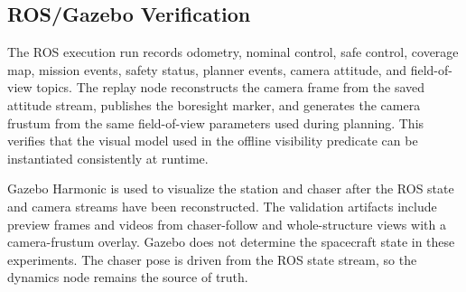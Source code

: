 \subsection{ROS/Gazebo Verification}

The ROS execution run records odometry, nominal control, safe control,
coverage map, mission events, safety status, planner events, camera attitude,
and field-of-view topics. The replay node reconstructs the camera frame from
the saved attitude stream, publishes the boresight marker, and generates the
camera frustum from the same field-of-view parameters used during planning.
This verifies that the visual model used in the offline visibility predicate
can be instantiated consistently at runtime.

Gazebo Harmonic is used to visualize the station and chaser after the ROS
state and camera streams have been reconstructed. The validation artifacts
include preview frames and videos from chaser-follow and whole-structure views
with a camera-frustum overlay. Gazebo does not determine the spacecraft state
in these experiments. The chaser pose is driven from the ROS state stream, so
the dynamics node remains the source of truth.
